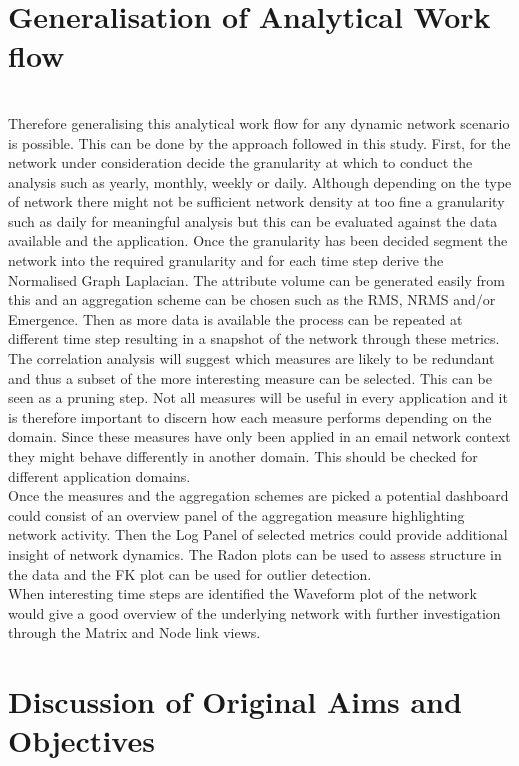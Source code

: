 \section{Generalisation of Analytical Work flow}
\\
Therefore generalising this analytical work flow for any dynamic network scenario is possible. This can be done by the approach followed in this study. First, for the network under consideration decide the granularity at which to conduct the analysis such as yearly, monthly, weekly or daily. Although depending on the type of network there might not be sufficient network density at too fine a granularity such as daily for meaningful analysis but this can be evaluated against the data available and the application. Once the granularity has been decided segment the network into the required granularity and for each time step derive the Normalised Graph Laplacian. The attribute volume can be generated easily from this and an aggregation scheme can be chosen such as the RMS, NRMS and/or Emergence. Then as more data is available the process can be repeated at different time step resulting in a snapshot of the network through these metrics. The correlation analysis will suggest which measures are likely to be redundant and thus a subset of the more interesting measure can be selected. This can be seen as a pruning step. Not all measures will be useful in every application and it is therefore important to discern how each measure performs depending on the domain. Since these measures have only been applied in an email network context they might behave differently in another domain. This should be checked for different application domains. \\

Once the measures and the aggregation schemes are picked a potential dashboard could consist of an overview panel of the aggregation measure highlighting network activity. Then the Log Panel of selected metrics could provide additional insight of network dynamics. The Radon plots can be used to assess structure in the data and the FK plot can be used for outlier detection. \\

When interesting time steps are identified the Waveform plot of the network would give a good overview of the underlying network with further investigation through the Matrix and Node link views.\\

\section{Discussion of Original Aims and Objectives}

